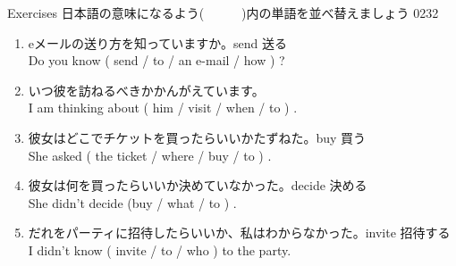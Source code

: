 \documentclass[aspectratio=169,xcolor={dvipsnames,table}]{beamer}
\begin{document}
\begin{frame}[plain]{Exercises}
日本語の意味になるよう(~~~~~~)内の単語を並べ替えましょう%
\hfill{\tiny 0232}\,{\scriptsize {}}

 \begin{enumerate}
  \item eメールの送り方を知っていますか。\hfill{\scriptsize send  送る}\\%
	Do you know ( send / to / an e-mail / how ) ?\hfill{}
	\visible<2->{\textcolor{BurntOrange}{\bfseries how to send an e-mail}}
  \item いつ彼を訪ねるべきかかんがえています。\\
	I am thinking about ( him / visit / when / to ) .\hfill{}
	\visible<3->{\textcolor{BurntOrange}{\bfseries when to visit him}}
  \item 彼女はどこでチケットを買ったらいいかたずねた。\hfill{\scriptsize buy  買う}\\
	She asked ( the ticket / where / buy / to  ) .\hfill{}
	\\
  \item 彼女は何を買ったらいいか決めていなかった。\hfill{\scriptsize decide  決める}\\
	She didn't decide (buy / what / to ) .
	\hfill\visible<5->{\textcolor{BurntOrange}{\bfseries what to buy}}
  \item だれをパーティに招待したらいいか、私はわからなかった。\hfill{\scriptsize invite  招待する}\\
	I didn't know ( invite / to / who ) to the party.\hfill{}
	\visible<6->{\textcolor{BurntOrange}{\bfseries who to invite}}
 \end{enumerate}
\end{frame}
\end{document}
